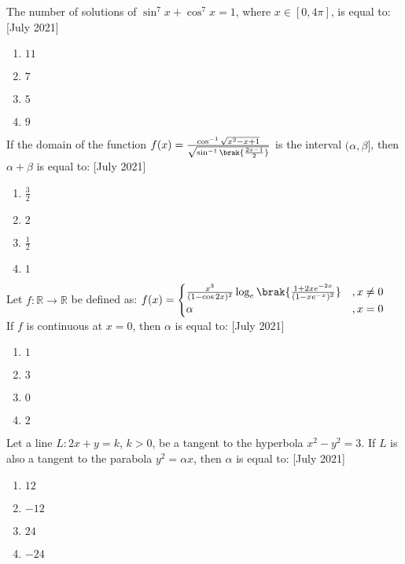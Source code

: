 \iffalse
\title{July 2021}
\author{AI24BTECH11012}
\section{mcq-single}
\fi
    \item The number of solutions of $ \sin^7 x + \cos^7 x = 1 $, where $ x \in [0, 4\pi] $, is equal to:
    \hfill{[July 2021]}
    \begin{enumerate}
        \item $11$
        \item $7$
        \item $5$
        \item $9$
    \end{enumerate}

    \item If the domain of the function $f(x) = \frac{\cos^{-1}\sqrt{x^2 - x + 1}}{\sqrt{\sin^{-1}\brak{\frac{2x-1}{2}}}}$ is the interval $ (\alpha, \beta] $, then $ \alpha + \beta $ is equal to:
    \hfill{[July 2021]}
    \begin{enumerate}
        \item $ \frac{3}{2} $
        \item $2$
        \item $ \frac{1}{2} $
        \item $1$
    \end{enumerate}

    \item Let $ f : \mathbb{R} \to \mathbb{R} $ be defined as:
    $f(x) =
    \begin{cases}
        \frac{x^3}{(1-\cos 2x)^2}\log_e\brak{\frac{1+2xe^{-2x}}{(1-xe^{-x})^2}} & , x \neq 0 \\
        \alpha & , x = 0
    \end{cases}$\\
    If $ f $ is continuous at $ x = 0 $, then $ \alpha $ is equal to:
    \hfill{[July 2021]}
    \begin{enumerate}
        \item $1$
        \item $3$
        \item $0$
        \item $2$
    \end{enumerate}

    \item Let a line $ L : 2x + y = k $, $ k > 0 $, be a tangent to the hyperbola $ x^2 - y^2 = 3 $. If $ L $ is also a tangent to the parabola $ y^2 = \alpha x $, then $ \alpha $ is equal to:
    \hfill{[July 2021]}
    \begin{enumerate}
        \item $12$
        \item $-12$
        \item $24$
        \item $-24$
    \end{enumerate}

